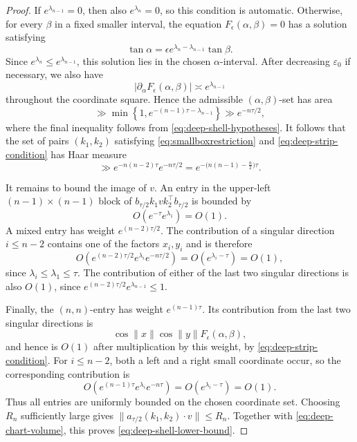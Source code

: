 \documentclass[reqno,11pt]{amsart}
\numberwithin{equation}{section}
\theoremstyle{definition}
\theoremstyle{remark}
\begin{document}
\begin{proof}
If $e^{\lambda_{n-1}}=0$, then also $e^{\lambda_n}=0$, so this
condition is automatic. Otherwise, for every $\beta$ in a fixed
smaller interval, the equation $F_\epsilon(\alpha,\beta)=0$ has a
solution satisfying
$$
\tan\alpha
=
\epsilon e^{\lambda_n-\lambda_{n-1}}\tan\beta.
$$
Since $e^{\lambda_n}\le e^{\lambda_{n-1}}$, this solution lies in the
chosen $\alpha$-interval. After decreasing $\varepsilon_0$ if necessary, we also
have
$$
|\partial_\alpha F_\epsilon(\alpha,\beta)|
\asymp e^{\lambda_{n-1}}
$$
throughout the coordinate square. Hence the admissible
$(\alpha,\beta)$-set has area
$$
\gg
\min\left\{1,e^{-(n-1)\tau-\lambda_{n-1}}\right\}
\gg e^{-n\tau/2},
$$
where the final inequality follows from
\eqref{eq:deep-shell-hypotheses}. It follows that the set of pairs
$(k_1,k_2)$ satisfying
\eqref{eq:smallboxrestriction} and
\eqref{eq:deep-strip-condition} has Haar measure
\begin{equation}\label{eq:deep-chart-volume}
\gg
e^{-n(n-2)\tau}e^{-n\tau/2}
=e^{-\bigl(n(n-1)-\frac n2\bigr)\tau}.
\end{equation}

It remains to bound the image of $v$. An entry in the upper-left
$(n-1)\times(n-1)$ block of
$b_{\tau/2}k_1vk_2^{\intercal}b_{\tau/2}$ is bounded by
$$
O(e^{-\tau}e^{\lambda_1})=O(1).
$$
A mixed entry has weight $e^{(n-2)\tau/2}$. The contribution of a
singular direction $i\le n-2$ contains one of the factors $x_i,y_i$
and is therefore
$$
O\left(
e^{(n-2)\tau/2}e^{\lambda_i}e^{-n\tau/2}
\right)
=
O(e^{\lambda_i-\tau})
=
O(1),
$$
since $\lambda_i\le\lambda_1\le\tau$. The contribution of either of
the last two singular directions is also $O(1)$, since
$e^{(n-2)\tau/2}e^{\lambda_{n-1}}\le1$.

Finally, the $(n,n)$-entry has weight $e^{(n-1)\tau}$. Its
contribution from the last two singular directions is
$$
\cos\|x\|\cos\|y\|F_\epsilon(\alpha,\beta),
$$
and hence is $O(1)$ after multiplication by this weight, by
\eqref{eq:deep-strip-condition}. For $i\le n-2$, both a left and a
right small coordinate occur, so the corresponding contribution is
$$
O\left(
e^{(n-1)\tau}e^{\lambda_i}e^{-n\tau}
\right)
=
O(e^{\lambda_i-\tau})
=
O(1).
$$
Thus all entries are uniformly bounded on the chosen coordinate set.
Choosing $R_n$ sufficiently large gives
$\|a_{\tau/2}(k_1,k_2)\cdot v\|\le R_n$. Together with
\eqref{eq:deep-chart-volume}, this proves
\eqref{eq:deep-shell-lower-bound}.
\end{proof}
\end{document}
